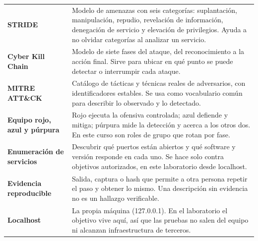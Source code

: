\documentclass[11pt,a4paper]{article}
\begin{document}
\begin{longtable}{@{}>{\raggedright\arraybackslash}p{4.2cm}>{\raggedright\arraybackslash}p{\dimexpr\linewidth-4.2cm-12pt\relax}@{}}
\textbf{STRIDE} & Modelo de amenazas con seis categorías: suplantación, manipulación, repudio, revelación de información, denegación de servicio y elevación de privilegios. Ayuda a no olvidar categorías al analizar un servicio.\\
\textbf{Cyber Kill Chain} & Modelo de siete fases del ataque, del reconocimiento a la acción final. Sirve para ubicar en qué punto se puede detectar o interrumpir cada ataque.\\
\textbf{MITRE ATT\&CK} & Catálogo de tácticas y técnicas reales de adversarios, con identificadores estables. Se usa como vocabulario común para describir lo observado y lo detectado.\\
\textbf{Equipo rojo, azul y púrpura} & Rojo ejecuta la ofensiva controlada; azul defiende y mitiga; púrpura mide la detección y acerca a los otros dos. En este curso son roles de grupo que rotan por fase.\\
\textbf{Enumeración de servicios} & Descubrir qué puertos están abiertos y qué software y versión responde en cada uno. Se hace solo contra objetivos autorizados, en este laboratorio desde localhost.\\
\textbf{Evidencia reproducible} & Salida, captura o hash que permite a otra persona repetir el paso y obtener lo mismo. Una descripción sin evidencia no es un hallazgo verificable.\\
\textbf{Localhost} & La propia máquina (127.0.0.1). En el laboratorio el objetivo vive aquí, así que las pruebas no salen del equipo ni alcanzan infraestructura de terceros.\\
\end{longtable}
\end{document}

